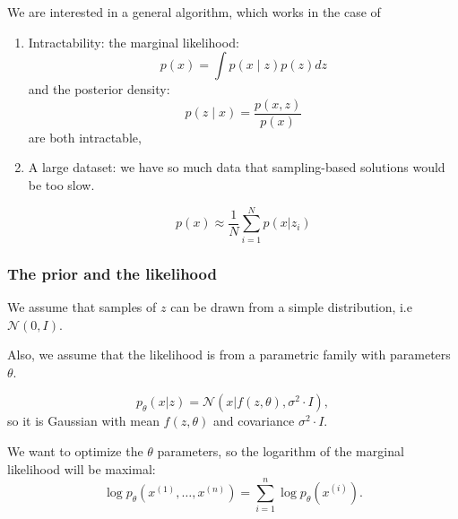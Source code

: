 \documentclass[t]{beamer}
\begin{document}
\begin{frame}
  We are interested in a general algorithm, which works in
  the case of

  \vspace{2mm}

  \begin{enumerate}
  \item Intractability: the marginal likelihood:
    \[
      p(x) = \int p(x\mid z) p(z) dz
    \]
    and the posterior density:
    \[
      p(z\mid x)= \frac{p(x, z)}{p(x)}
    \]
    are both intractable,

    \vspace{2mm}

  \item A large dataset: we have so much data that
    sampling-based solutions would be too slow.

    \[
      p(x) \approx \frac{1}{N}\sum_{i=1}^N p(x|z_i)
    \]
  \end{enumerate}
\end{frame}


\begin{frame}
  \frametitle{The prior and the likelihood}
  
   We assume that samples of $z$ can be drawn from a simple
  distribution, i.e $\mathcal{N}(0,I)$.

  \vspace{2mm}

  Also, we assume that the likelihood is from a parametric
  family with parameters $\theta$.
  
  \[
    p_\theta(x|z) = \mathcal{N}(x| f(z,\theta), \sigma^2
    \cdot I),
  \]
  so it is Gaussian with mean $f(z,\theta)$ and covariance
  $\sigma^2\cdot I$.

  \vspace{2mm}

  We want to optimize the $\theta$ parameters, so the
  logarithm of the marginal likelihood will be maximal:
  \[
    \log p_{\theta}(x^{(1)}, \dots, x^{(n)})= \sum_{i=1}^n
    \log p_{\theta}(x^{(i)}).
  \]


\end{frame}
\end{document}
